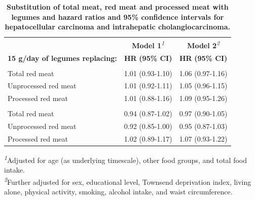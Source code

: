 \documentclass[sn-basic,Numbered,iicol,pdflatex]{sn-jnl}
\begin{document}
\begin{appendices}
\begin{table}[!t]
\caption{{\small \textbf{Substitution of total meat, red meat and processed meat with legumes and hazard ratios and 95\% confidence intervals for hepatocellular carcinoma and intrahepatic cholangiocarcinoma.}}}\label{tab-cancer}
\begin{tabular*}{1\linewidth}{@{\extracolsep{\fill}}lcc}
\toprule
 & \textbf{Model 1}\textsuperscript{\textit{1}} & \textbf{Model 2}\textsuperscript{\textit{2}} \\ 
\cmidrule(lr){2-2} \cmidrule(lr){3-3}
\textbf{15 g/day of legumes replacing:} & \textbf{HR} \textbf{(95\% CI)} & \textbf{HR} \textbf{(95\% CI)} \\ 
\midrule\addlinespace[2.5pt]
\multicolumn{3}{l}{{\bfseries Hepatocellular carcinoma}} \\ 
\midrule\addlinespace[2.5pt]
Total red meat & 1.01 (0.93-1.10) & 1.06 (0.97-1.16) \\ 
Unprocessed red meat & 1.01 (0.92-1.11) & 1.05 (0.96-1.15) \\ 
Processed red meat & 1.01 (0.88-1.16) & 1.09 (0.95-1.26) \\ 
\midrule\addlinespace[2.5pt]
\multicolumn{3}{l}{{\bfseries Intrahepatic cholangiocarcinoma}} \\ 
\midrule\addlinespace[2.5pt]
Total red meat & 0.94 (0.87-1.02) & 0.97 (0.90-1.05) \\ 
Unprocessed red meat & 0.92 (0.85-1.00) & 0.95 (0.87-1.03) \\ 
Processed red meat & 1.02 (0.89-1.17) & 1.07 (0.93-1.22) \\ 
\bottomrule
\end{tabular*}
\begin{minipage}{\linewidth}
\textsuperscript{\textit{1}}Adjusted for age (as underlying timescale), other food groups, and total food intake.\\
\textsuperscript{\textit{2}}Further adjusted for sex, educational level, Townsend deprivation index, living alone, physical activity, smoking, alcohol intake, and waist circumference.\\
\end{minipage}
\end{table}


\end{appendices}
\end{document}
